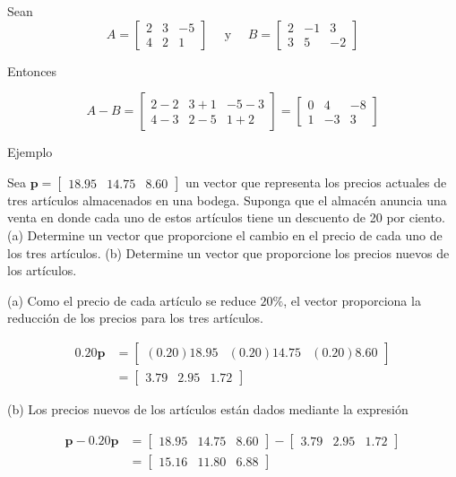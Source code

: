 \documentclass{article}
\begin{document}
Sean
$$A=\left[\begin{array}{rrr}
2 & 3 & -5 \\
4 & 2 & 1
\end{array}\right] \quad \text { y } \quad B=\left[\begin{array}{rrr}
2 & -1 & 3 \\
3 & 5 & -2
\end{array}\right]$$

Entonces

$$A-B=\left[\begin{array}{llr}
2-2 & 3+1 & -5-3 \\
4-3 & 2-5 & 1+2
\end{array}\right]=\left[\begin{array}{rrr}
0 & 4 & -8 \\
1 & -3 & 3
\end{array}\right]$$

\begin{large}
    Ejemplo
\end{large}

Sea $\mathbf{p}=\left[\begin{array}{lll}18.95 & 14.75 & 8.60\end{array}\right]$ un vector que representa los precios actuales de tres artículos almacenados en una bodega. Suponga que el almacén anuncia una venta en donde cada uno de estos artículos tiene un descuento de 20 por ciento.
(a) Determine un vector que proporcione el cambio en el precio de cada uno de los tres artículos.
(b) Determine un vector que proporcione los precios nuevos de los artículos.

(a) Como el precio de cada artículo se reduce $20 \%$, el vector proporciona la reducción de los precios para los tres artículos.

$$\begin{aligned}
    0.20 \mathbf{p} & =\left[\begin{array}{lll}
    (0.20) 18.95 & (0.20) 14.75 & (0.20) 8.60
    \end{array}\right] \\
    & =\left[\begin{array}{lll}
    3.79 & 2.95 & 1.72
    \end{array}\right]
\end{aligned}$$


(b) Los precios nuevos de los artículos están dados mediante la expresión

$$ \begin{aligned}
\mathbf{p}-0.20 \mathbf{p} & =\left[\begin{array}{lll}
18.95 & 14.75 & 8.60
\end{array}\right]-\left[\begin{array}{lll}
3.79 & 2.95 & 1.72
\end{array}\right] \\
& =\left[\begin{array}{lll}
15.16 & 11.80 & 6.88
\end{array}\right] 
\end{aligned} $$
\end{document}

